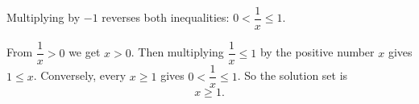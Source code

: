 Multiplying by $-1$ reverses both inequalities: $0<\dfrac{1}{x}\le1$.

From $\dfrac{1}{x}>0$ we get $x>0$. Then multiplying $\dfrac{1}{x}\le1$ by the positive number $x$ gives $1\le x$. Conversely, every $x\ge1$ gives $0<\dfrac{1}{x}\le1$. So the solution set is
\[
\boxed{x\ge1}.
\]
